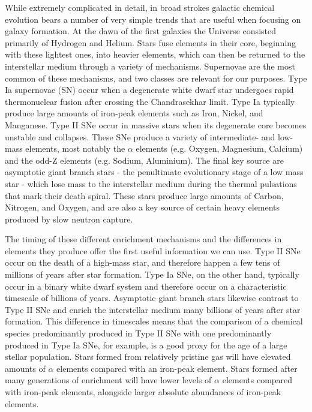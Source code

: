 While extremely complicated in detail, in broad strokes galactic chemical evolution bears a number of very simple trends that are useful when focusing on galaxy formation. At the dawn of the first galaxies the Universe consisted primarily of Hydrogen and Helium. Stars fuse elements in their core, beginning with these lightest ones, into heavier elements, which can then be returned to the interstellar medium through a variety of mechanisms. Supernovae are the most common of these mechanisms, and two classes are relevant for our purposes. Type Ia supernovae (SN) occur when a degenerate white dwarf star undergoes rapid thermonuclear fusion after crossing the Chandrasekhar limit. Type Ia typically produce large amounts of iron-peak elements such as Iron, Nickel, and Manganese. Type II SNe occur in massive stars when its degenerate core becomes unstable and collapses. These SNe produce a variety of intermediate- and low-mass elements, most notably the $\alpha$ elements (e.g. Oxygen, Magnesium, Calcium) and the odd-Z elements (e.g. Sodium, Aluminium). The final key source are asymptotic giant branch stars - the penultimate evolutionary stage of a low mass star - which lose mass to the interstellar medium during the thermal pulsations that mark their death spiral. These stars produce large amounts of Carbon, Nitrogen, and Oxygen, and are also a key source of certain heavy elements produced by slow neutron capture.

The timing of these different enrichment mechanisms and the differences in elements they produce offer the first useful information we can use. Type II SNe occur on the death of a high-mass star, and therefore happen a few tens of millions of years after star formation. Type Ia SNe, on the other hand, typically occur in a binary white dwarf system and therefore occur on a characteristic timescale of billions of years. Asymptotic giant branch stars likewise contrast to Type II SNe and enrich the interstellar medium many billions of years after star formation. This difference in timescales means that the comparison of a chemical species predominantly produced in Type II SNe with one predominantly produced in Type Ia SNe, for example, is a good proxy for the age of a large stellar population. Stars formed from relatively pristine gas will have elevated amounts of $\alpha$ elements compared with an iron-peak element. Stars formed after many generations of enrichment will have lower levels of $\alpha$ elements compared with iron-peak elements, alongside larger absolute abundances of iron-peak elements.

